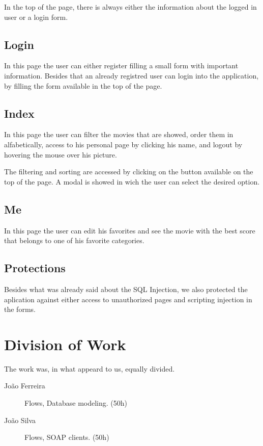 \documentclass[12pt]{article}
\begin{document}
In the top of the page, there is always either the information about the logged in user or a login form.

\subsection{Login}
\indent \indent In this page the user can either register filling a small form with important information.
Besides that an already registred user can login into the application, by filling the form available in the top of the page.

\subsection{Index}
\indent \indent In this page the user can filter the movies that are showed, order them in alfabetically, access to his personal page by clicking his name, and logout by hovering the mouse over his picture.

The filtering and sorting are accessed by clicking on the button available on the top of the page. A modal is showed in wich the user can select the desired option.

\subsection{Me}
\indent \indent In this page the user can edit his favorites and see the movie with the best score that belongs to one of his favorite categories.

\subsection{Protections}
\indent \indent Besides what was already said about the SQL Injection, we also protected the aplication against either access to unauthorized pages and scripting injection in the forms.
\clearpage

\section{Division of Work}
\indent \indent The work was, in what appeard to us, equally divided.
\begin{description}
	\item [João Ferreira] Flows, Database modeling. (50h)
	\item [João Silva] Flows, SOAP clients. (50h)
\end{description}
\clearpage
\end{document}
